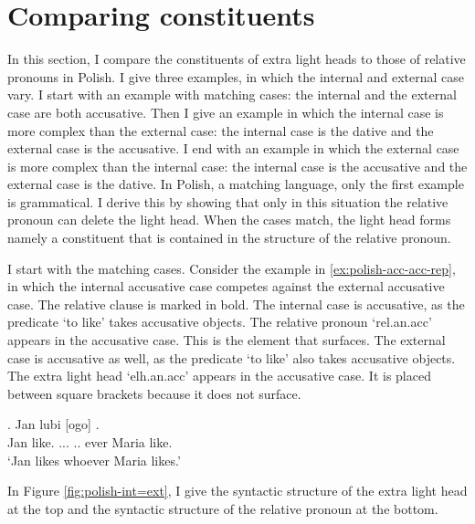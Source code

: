 \section{Comparing constituents}\label{sec:comparing-polish}

In this section, I compare the constituents of extra light heads to those of relative pronouns in Polish. I give three examples, in which the internal and external case vary.
I start with an example with matching cases: the internal and the external case are both accusative.
Then I give an example in which the internal case is more complex than the external case: the internal case is the dative and the external case is the accusative.
I end with an example in which the external case is more complex than the internal case: the internal case is the accusative and the external case is the dative.
In Polish, a matching language, only the first example is grammatical. I derive this by showing that only in this situation the relative pronoun can delete the light head. When the cases match, the light head forms namely a constituent that is contained in the structure of the relative pronoun.

I start with the matching cases.
Consider the example in \ref{ex:polish-acc-acc-rep}, in which the internal accusative case competes against the external accusative case. The relative clause is marked in bold.
The internal case is accusative, as the predicate  `to like' takes accusative objects. The relative pronoun  `\ac{rel}.\ac{an}.\ac{acc}' appears in the accusative case. This is the element that surfaces.
The external case is accusative as well, as the predicate  `to like' also takes accusative objects. The extra light head  `\ac{elh}.\ac{an}.\ac{acc}' appears in the accusative case. It is placed between square brackets because it does not surface.

\exg. Jan lubi [ogo]    .\\
 Jan like.\scsub{[acc]} ...  .. ever Maria like.\scsub{[acc]}\\
 `Jan likes whoever Maria likes.' \label{ex:polish-acc-acc-rep}

In Figure \ref{fig:polish-int=ext}, I give the syntactic structure of the extra light head at the top and the syntactic structure of the relative pronoun at the bottom.

